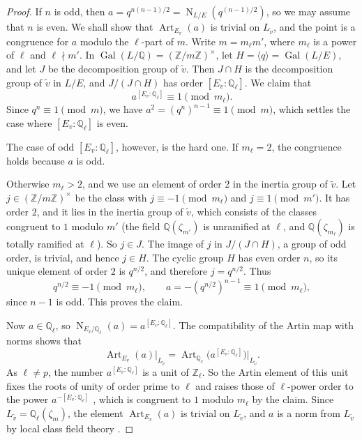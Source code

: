 \documentclass[a4paper,11pt]{amsart}
\theoremstyle{definition}
\theoremstyle{remark}
\numberwithin{equation}{section}
\newcommand{\Q}{\mathbb{Q}}
\newcommand{\Z}{\mathbb{Z}}
\DeclareMathOperator{\Gal}{Gal}
\DeclareMathOperator{\Art}{Art}
\DeclareMathOperator{\Nm}{N}
\begin{document}
\begin{proof}
If $n$ is odd, then $a=q^{n(n-1)/2}=\Nm_{L/E}(q^{(n-1)/2})$, so we may assume that $n$ is even. We shall show that $\Art_{E_v}(a)$ is trivial on $L_{\tilde v}$, and the point is a congruence for $a$ modulo the $\ell$-part of $m$. Write $m=m_\ell m'$, where $m_\ell$ is a power of $\ell$ and $\ell\nmid m'$. In $\Gal(L/\Q)=(\Z/m\Z)^\times$, let $H=\langle q\rangle=\Gal(L/E)$, and let $J$ be the decomposition group of $\tilde v$. Then $J\cap H$ is the decomposition group of $\tilde v$ in $L/E$, and $J/(J\cap H)$ has order $[E_v:\Q_\ell]$. We claim that
\[
 a^{[E_v:\Q_\ell]}\equiv1\pmod{m_\ell}.
\]
Since $q^n\equiv1\pmod m$, we have $a^2=(q^n)^{n-1}\equiv1\pmod m$, which settles the case where $[E_v:\Q_\ell]$ is even.

The case of odd $[E_v:\Q_\ell]$, however, is the hard one. If $m_\ell=2$, the congruence holds because $a$ is odd.

Otherwise $m_\ell>2$, and we use an element of order $2$ in the inertia group of $\tilde v$. Let $j\in(\Z/m\Z)^\times$ be the class with $j\equiv-1\pmod{m_\ell}$ and $j\equiv1\pmod{m'}$. It has order $2$, and it lies in the inertia group of $\tilde v$, which consists of the classes congruent to $1$ modulo $m'$ (the field $\Q(\zeta_{m'})$ is unramified at $\ell$, and $\Q(\zeta_{m_\ell})$ is totally ramified at $\ell$). So $j\in J$. The image of $j$ in $J/(J\cap H)$, a group of odd order, is trivial, and hence $j\in H$. The cyclic group $H$ has even order $n$, so its unique element of order $2$ is $q^{n/2}$, and therefore $j=q^{n/2}$. Thus
\[
 q^{n/2}\equiv-1\pmod{m_\ell},\qquad a=-(q^{n/2})^{n-1}\equiv1\pmod{m_\ell},
\]
since $n-1$ is odd. This proves the claim.

Now $a\in\Q_\ell$, so $\Nm_{E_v/\Q_\ell}(a)=a^{[E_v:\Q_\ell]}$. The compatibility of the Artin map with norms \cite[III, Lemma~3.2]{Mil20} shows that
\[
 \Art_{E_v}(a)|_{L_{\tilde v}}=\Art_{\Q_\ell}\bigl(a^{[E_v:\Q_\ell]}\bigr)\big|_{L_{\tilde v}}.
\]
As $\ell\neq p$, the number $a^{[E_v:\Q_\ell]}$ is a unit of $\Z_\ell$. So the Artin element of this unit fixes the roots of unity of order prime to $\ell$ and raises those of $\ell$-power order to the power $a^{-[E_v:\Q_\ell]}$ \cite[I, Example~3.13]{Mil20}, which is congruent to $1$ modulo $m_\ell$ by the claim. Since $L_{\tilde v}=\Q_\ell(\zeta_m)$, the element $\Art_{E_v}(a)$ is trivial on $L_{\tilde v}$, and $a$ is a norm from $L_{\tilde v}$ by local class field theory \cite[III, Theorem~3.4(b)]{Mil20}.
\end{proof}
\end{document}
